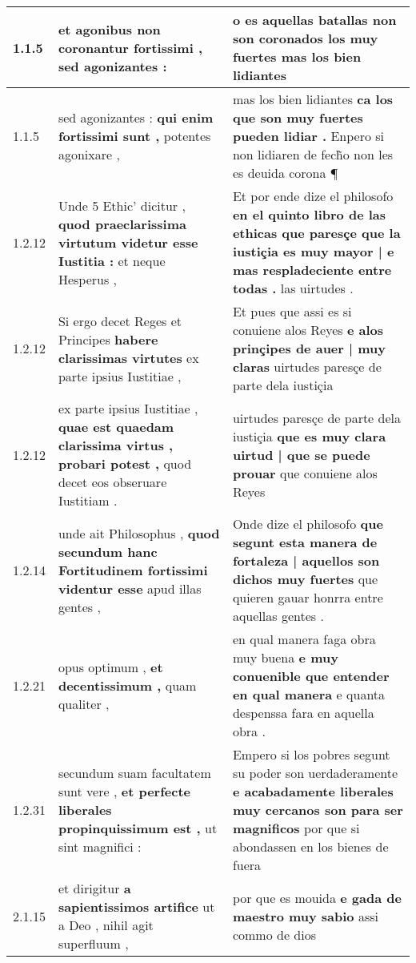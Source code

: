 \begin{tabular}{|p{1cm}|p{6.5cm}|p{6.5cm}|}

\hline
1.1.5 & et agonibus \textbf{ non coronantur fortissimi , } sed agonizantes : & o es aquellas batallas \textbf{ non son coronados los muy fuertes } mas los bien lidiantes \\\hline
1.1.5 & sed agonizantes : \textbf{ qui enim fortissimi sunt , } potentes agonixare , & mas los bien lidiantes \textbf{ ca los que son muy fuertes pueden lidiar . } Enpero si non lidiaren de fech̃o non les es deuida corona ¶ \\\hline
1.2.12 & Unde 5 Ethic’ dicitur , \textbf{ quod praeclarissima virtutum videtur esse Iustitia : } et neque Hesperus , & Et por ende dize el philosofo \textbf{ en el quinto libro de las ethicas que paresçe que la iustiçia es muy mayor | e mas respladeciente entre todas . } las uirtudes . \\\hline
1.2.12 & Si ergo decet Reges et Principes \textbf{ habere clarissimas virtutes } ex parte ipsius Iustitiae , & Et pues que assi es si conuiene alos Reyes \textbf{ e alos prinçipes de auer | muy claras } uirtudes paresçe de parte dela iustiçia \\\hline
1.2.12 & ex parte ipsius Iustitiae , \textbf{ quae est quaedam clarissima virtus , probari potest , } quod decet eos obseruare Iustitiam . & uirtudes paresçe de parte dela iustiçia \textbf{ que es muy clara uirtud | que se puede prouar } que conuiene alos Reyes \\\hline
1.2.14 & unde ait Philosophus , \textbf{ quod secundum hanc Fortitudinem fortissimi videntur esse } apud illas gentes , & Onde dize el philosofo \textbf{ que segunt esta manera de fortaleza | aquellos son dichos muy fuertes } que quieren gauar honrra entre aquellas gentes . \\\hline
1.2.21 & opus optimum , \textbf{ et decentissimum , } quam qualiter , & en qual manera faga obra muy buena \textbf{ e muy conuenible que entender en qual manera } e quanta despenssa fara en aquella obra . \\\hline
1.2.31 & secundum suam facultatem sunt vere , \textbf{ et perfecte liberales propinquissimum est , } ut sint magnifici : & Empero si los pobres segunt su poder son uerdaderamente \textbf{ e acabadamente liberales muy cercanos son para ser magnificos } por que si abondassen en los bienes de fuera \\\hline
2.1.15 & et dirigitur \textbf{ a sapientissimos artifice } ut a Deo , nihil agit superfluum , & por que es mouida \textbf{ e gada de maestro muy sabio } assi commo de dios \\\hline

\end{tabular}
